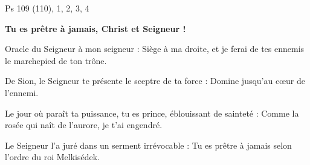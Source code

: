  Ps 109 (110), 1, 2, 3, 4

\textbf{Tu es prêtre à jamais, Christ et Seigneur !}

Oracle du Seigneur à mon seigneur :
\og Siège à ma droite,
et je ferai de tes ennemis
le marchepied de ton trône. \fg{}

De Sion, le Seigneur te présente
le sceptre de ta force :
\og Domine jusqu’au cœur de l’ennemi. \fg{}

Le jour où paraît ta puissance,
tu es prince, éblouissant de sainteté :
\og Comme la rosée qui naît de l’aurore,
je t’ai engendré. \fg{}

Le Seigneur l’a juré
dans un serment irrévocable :
\og Tu es prêtre à jamais
selon l’ordre du roi Melkisédek. \fg{}
